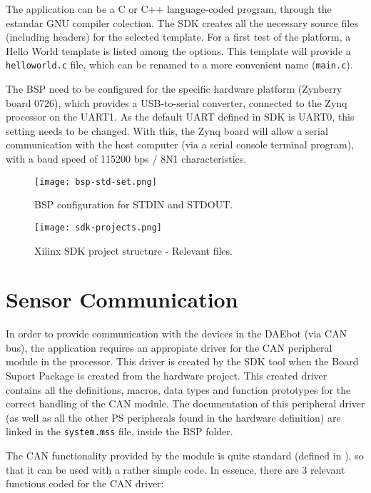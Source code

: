 The application can be a C or C++ language-coded program, through the estandar GNU compiler colection. The SDK creates all the necessary source files (including headers) for the selected template. For a first test of the platform, a Hello World template\cite{wiki} is listed among the options. This template will provide a \texttt{helloworld.c} file, which can be renamed to a more convenient name (\texttt{main.c}).

The BSP need to be configured for the specific hardware platform (Zynberry board 0726), which provides a USB-to-serial converter, connected to the Zynq processor on the UART1. As the default UART defined in SDK is UART0, this setting needs to be changed. With this, the Zynq board will allow a serial communication with the host computer (via a serial console terminal program), with a baud speed of 115200 bps / 8N1 characteristics.

\begin{figure}[!tbp]
  \centering
  \begin{minipage}[b]{0.6\textwidth}
    \texttt{[image: bsp-std-set.png]}
    \caption{BSP configuration for STDIN and STDOUT.}\label{fig:bsp-std-set}
  \end{minipage}
  \hfill
  \begin{minipage}[b]{0.3\textwidth}
    \texttt{[image: sdk-projects.png]}
    \caption{Xilinx SDK project structure - Relevant files.}\label{fig:sdk-project}
  \end{minipage}
\end{figure}

\section{Sensor Communication} \label{sensorcom}

In order to provide communication with the devices in the DAEbot (via CAN bus), the application requires an appropiate driver for the CAN peripheral module in the processor. This driver is created by the SDK tool when the Board Suport Package is created from the hardware project. This created driver contains all the definitions, macros, data types and function prototypes for the correct handling of the CAN module. The documentation of this peripheral driver (as well as all the other PS peripherals found in the hardware definition) are linked in the \texttt{system.mss} file, inside the BSP folder.

The CAN functionality provided by the module is quite standard (defined in \cite{can}), so that it can be used with a rather simple code. In essence, there are 3 relevant functions coded for the CAN driver:

